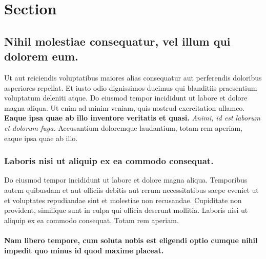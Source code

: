 \documentclass[
]{report}
\let\oldparagraph\paragraph
\renewcommand{\paragraph}[1]{\oldparagraph{#1}\mbox{}}
\begin{document}
\hypertarget{section-1.2}{%
\section{Section}\label{section-1.2}}

\hypertarget{nihil-molestiae-consequatur-vel-illum-qui-dolorem-eum.}{%
\subsection{Nihil molestiae consequatur, vel illum qui dolorem
eum.}\label{nihil-molestiae-consequatur-vel-illum-qui-dolorem-eum.}}

Ut aut reiciendis voluptatibus maiores alias consequatur aut perferendis
doloribus asperiores repellat. Et iusto odio dignissimos ducimus qui
blanditiis praesentium voluptatum deleniti atque. Do eiusmod tempor
incididunt ut labore et dolore magna aliqua. Ut enim ad minim veniam,
quis nostrud exercitation ullamco. \textbf{Eaque ipsa quae ab illo
inventore veritatis et quasi.} \emph{Animi, id est laborum et dolorum
fuga.} Accusantium doloremque laudantium, totam rem aperiam, eaque ipsa
quae ab illo.

\hypertarget{laboris-nisi-ut-aliquip-ex-ea-commodo-consequat.}{%
\subsubsection{Laboris nisi ut aliquip ex ea commodo
consequat.}\label{laboris-nisi-ut-aliquip-ex-ea-commodo-consequat.}}

Do eiusmod tempor incididunt ut labore et dolore magna aliqua.
Temporibus autem quibusdam et aut officiis debitis aut rerum
necessitatibus saepe eveniet ut et voluptates repudiandae sint et
molestiae non recusandae. Cupiditate non provident, similique sunt in
culpa qui officia deserunt mollitia. Laboris nisi ut aliquip ex ea
commodo consequat. Totam rem aperiam.

\hypertarget{nam-libero-tempore-cum-soluta-nobis-est-eligendi-optio-cumque-nihil-impedit-quo-minus-id-quod-maxime-placeat.}{%
\paragraph{\texorpdfstring{Nam libero tempore, cum soluta nobis est
eligendi optio cumque nihil impedit quo minus id quod maxime
placeat.\newline}{Nam libero tempore, cum soluta nobis est eligendi optio cumque nihil impedit quo minus id quod maxime placeat.}}\label{nam-libero-tempore-cum-soluta-nobis-est-eligendi-optio-cumque-nihil-impedit-quo-minus-id-quod-maxime-placeat.}}
\end{document}
